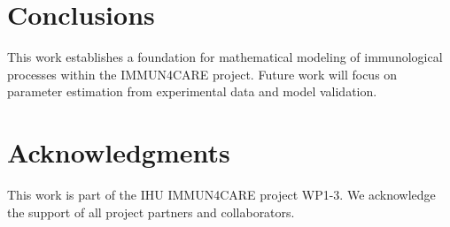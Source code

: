 \documentclass[12pt,a4paper]{article}
\begin{document}
\section{Conclusions}

This work establishes a foundation for mathematical modeling of immunological processes within the IMMUN4CARE project. Future work will focus on parameter estimation from experimental data and model validation.

\section*{Acknowledgments}

This work is part of the IHU IMMUN4CARE project WP1-3. We acknowledge the support of all project partners and collaborators.


\end{document}
